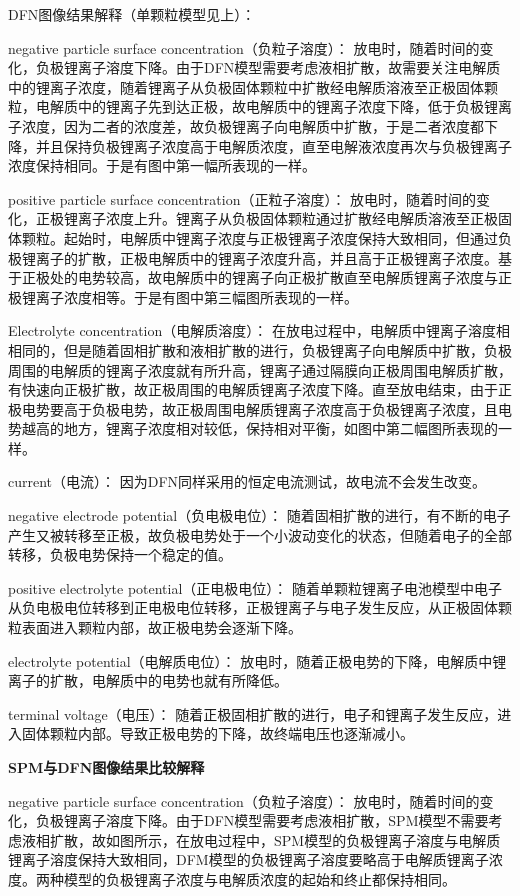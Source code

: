 \documentclass[12pt]{ctexart}%
\begin{document}
DFN图像结果解释（单颗粒模型见上）：

negative particle surface concentration（负粒子溶度）：
放电时，随着时间的变化，负极锂离子溶度下降。由于DFN模型需要考虑液相扩散，故需要关注电解质中的锂离子浓度，随着锂离子从负极固体颗粒中扩散经电解质溶液至正极固体颗粒，电解质中的锂离子先到达正极，故电解质中的锂离子浓度下降，低于负极锂离子浓度，因为二者的浓度差，故负极锂离子向电解质中扩散，于是二者浓度都下降，并且保持负极锂离子浓度高于电解质浓度，直至电解液浓度再次与负极锂离子浓度保持相同。于是有图中第一幅所表现的一样。

positive particle surface concentration（正粒子溶度）：
放电时，随着时间的变化，正极锂离子浓度上升。锂离子从负极固体颗粒通过扩散经电解质溶液至正极固体颗粒。起始时，电解质中锂离子浓度与正极锂离子浓度保持大致相同，但通过负极锂离子的扩散，正极电解质中的锂离子浓度升高，并且高于正极锂离子浓度。基于正极处的电势较高，故电解质中的锂离子向正极扩散直至电解质锂离子浓度与正极锂离子浓度相等。于是有图中第三幅图所表现的一样。

Electrolyte concentration（电解质溶度）：
在放电过程中，电解质中锂离子溶度相相同的，但是随着固相扩散和液相扩散的进行，负极锂离子向电解质中扩散，负极周围的电解质的锂离子浓度就有所升高，锂离子通过隔膜向正极周围电解质扩散，有快速向正极扩散，故正极周围的电解质锂离子浓度下降。直至放电结束，由于正极电势要高于负极电势，故正极周围电解质锂离子浓度高于负极锂离子浓度，且电势越高的地方，锂离子浓度相对较低，保持相对平衡，如图中第二幅图所表现的一样。

current（电流）：
因为DFN同样采用的恒定电流测试，故电流不会发生改变。

negative electrode potential（负电极电位）：
随着固相扩散的进行，有不断的电子产生又被转移至正极，故负极电势处于一个小波动变化的状态，但随着电子的全部转移，负极电势保持一个稳定的值。

positive electrolyte potential（正电极电位）：
随着单颗粒锂离子电池模型中电子从负电极电位转移到正电极电位转移，正极锂离子与电子发生反应，从正极固体颗粒表面进入颗粒内部，故正极电势会逐渐下降。

electrolyte potential（电解质电位）：
放电时，随着正极电势的下降，电解质中锂离子的扩散，电解质中的电势也就有所降低。

terminal voltage（电压）：
随着正极固相扩散的进行，电子和锂离子发生反应，进入固体颗粒内部。导致正极电势的下降，故终端电压也逐渐减小。

\noindent\textbf{SPM与DFN图像结果比较解释}

negative particle surface concentration（负粒子溶度）：
放电时，随着时间的变化，负极锂离子溶度下降。由于DFN模型需要考虑液相扩散，SPM模型不需要考虑液相扩散，故如图所示，在放电过程中，SPM模型的负极锂离子溶度与电解质锂离子溶度保持大致相同，DFM模型的负极锂离子溶度要略高于电解质锂离子浓度。两种模型的负极锂离子浓度与电解质浓度的起始和终止都保持相同。
\end{document}

